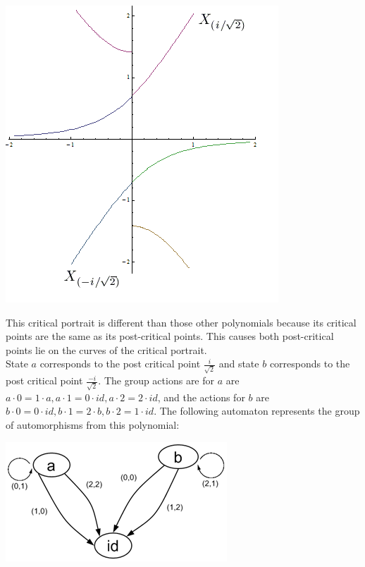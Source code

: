 \documentclass[11pt]{amsart}
\theoremstyle{definition}
\theoremstyle{remark}
\numberwithin{equation}{section}
\begin{document}
\begin{center}
\includegraphics[scale=0.5]{1_5critical1.png}
\end{center} 

\indent This critical portrait is different than those other polynomials because its critical points are the same as its post-critical points. This causes both post-critical points lie on the curves of the critical portrait.\\

\indent State $a$ corresponds to the post critical point $\frac{i}{\sqrt{2}}$ and state $b$ corresponds to the post critical point $\frac{-i}{\sqrt{2}}$. The group actions are for $a$ are $a \cdot 0 = 1 \cdot a, a \cdot 1 = 0 \cdot id, a \cdot 2 = 2 \cdot id$, and the actions for $b$ are $b \cdot 0 = 0 \cdot id, b \cdot 1 = 2 \cdot b, b \cdot 2 = 1 \cdot id$. The following automaton represents the group of automorphisms from this polynomial:

\begin{center}
\includegraphics{z_32z.png}
\end{center} 
\end{document}
